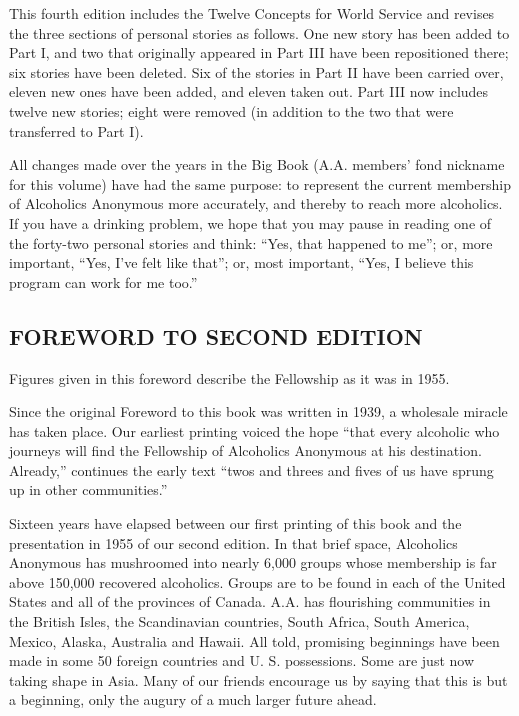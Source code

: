 This fourth edition includes the Twelve Concepts for World Service and revises the three sections of personal stories as follows.
One new story has been added to Part I, and two that originally appeared in Part III have been repositioned there; 
six stories have been deleted.
Six of the stories in Part II have been carried over, eleven new ones have been added, and eleven taken out.
Part III now includes twelve new stories; 
eight were removed (in addition to the two that were transferred to Part I).

All changes made over the years in the Big Book (A.A. members’ fond nickname for this volume) have had the same purpose: 
to represent the current membership of Alcoholics Anonymous more accurately, and thereby to reach more alcoholics.
If you have a drinking problem, we hope that you may pause in reading one of the forty-two personal stories and think: 
“Yes, that happened to me”; 
or, more important, “Yes, I’ve felt like that”; 
or, most important, “Yes, I believe this program can work for me too.”



\subsection{FOREWORD TO SECOND EDITION}

Figures given in this foreword describe the
Fellowship as it was in 1955.

Since the original Foreword to this book was written in 1939, a wholesale miracle has taken place. 
Our earliest printing voiced the hope “that every alcoholic who journeys will find the Fellowship of Alcoholics Anonymous at his destination. Already,”
continues the early text “twos and threes and fives of us have sprung up in other communities.”

Sixteen years have elapsed between our first printing of this book and the presentation in 1955 of our second edition.
In that brief space, Alcoholics Anonymous has mushroomed into nearly 6,000 groups whose membership is far above 150,000 recovered alcoholics.
Groups are to be found in each of the United States and all of the provinces of Canada.
A.A. has flourishing communities in the British Isles, the Scandinavian countries, South Africa, South America, Mexico, Alaska, Australia and Hawaii. 
All told, promising beginnings have been made in some 50 foreign countries and U. S. possessions. 
Some are just now taking shape in Asia. 
Many of our friends encourage us by saying that this is but a beginning, only the augury of a much larger future ahead.


